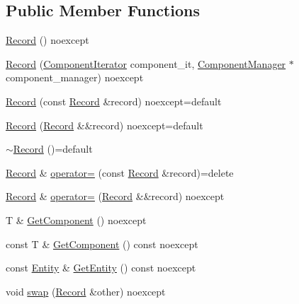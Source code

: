 \subsection*{Public Member Functions}
\begin{DoxyCompactItemize}
\item 
\mbox{\hyperlink{classmage_1_1_component_manager_1_1_record_a404e53e118de147026911892f572c70a}{Record}} () noexcept
\item 
\mbox{\hyperlink{classmage_1_1_component_manager_1_1_record_a355af51c1e497d21bbe6612add6fe7a9}{Record}} (\mbox{\hyperlink{classmage_1_1_component_manager_1_1_record_ac9f303d103be56826be484204f17c249}{Component\+Iterator}} component\+\_\+it, \mbox{\hyperlink{classmage_1_1_component_manager}{Component\+Manager}} $\ast$component\+\_\+manager) noexcept
\item 
\mbox{\hyperlink{classmage_1_1_component_manager_1_1_record_acc167a0e13b17bf874ee9c8bd4283c8c}{Record}} (const \mbox{\hyperlink{classmage_1_1_component_manager_1_1_record}{Record}} \&record) noexcept=default
\item 
\mbox{\hyperlink{classmage_1_1_component_manager_1_1_record_a2626e285001ccfb2f209d98b5be3499f}{Record}} (\mbox{\hyperlink{classmage_1_1_component_manager_1_1_record}{Record}} \&\&record) noexcept=default
\item 
\mbox{\hyperlink{classmage_1_1_component_manager_1_1_record_a4cbe8e28a213f4d6657c0e4e0f0aa326}{$\sim$\+Record}} ()=default
\item 
\mbox{\hyperlink{classmage_1_1_component_manager_1_1_record}{Record}} \& \mbox{\hyperlink{classmage_1_1_component_manager_1_1_record_aff9e4c6ba2e99c72dc07be6fadfa96a3}{operator=}} (const \mbox{\hyperlink{classmage_1_1_component_manager_1_1_record}{Record}} \&record)=delete
\item 
\mbox{\hyperlink{classmage_1_1_component_manager_1_1_record}{Record}} \& \mbox{\hyperlink{classmage_1_1_component_manager_1_1_record_ad74156f8e48b4689de4b4a139f7a9429}{operator=}} (\mbox{\hyperlink{classmage_1_1_component_manager_1_1_record}{Record}} \&\&record) noexcept
\item 
T \& \mbox{\hyperlink{classmage_1_1_component_manager_1_1_record_ab8414fbd8ac0c113eece521db48bb302}{Get\+Component}} () noexcept
\item 
const T \& \mbox{\hyperlink{classmage_1_1_component_manager_1_1_record_a8c0078ceb19423d2c202e2f825d42f04}{Get\+Component}} () const noexcept
\item 
const \mbox{\hyperlink{classmage_1_1_entity}{Entity}} \& \mbox{\hyperlink{classmage_1_1_component_manager_1_1_record_a22ec458d4dfde15cf1066fd12a16608e}{Get\+Entity}} () const noexcept
\item 
void \mbox{\hyperlink{classmage_1_1_component_manager_1_1_record_a31daa8e490f33933181e856ff3dd1124}{swap}} (\mbox{\hyperlink{classmage_1_1_component_manager_1_1_record}{Record}} \&other) noexcept
\end{DoxyCompactItemize}
